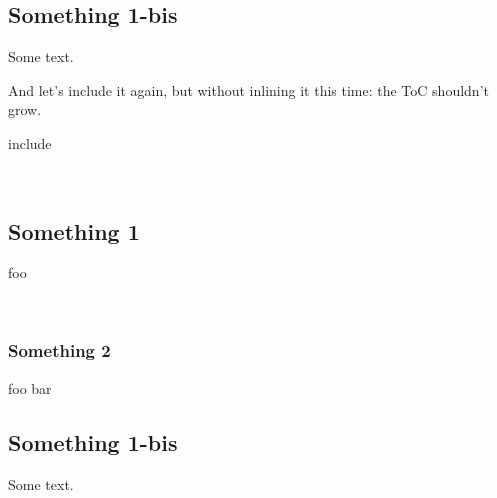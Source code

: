 \subsection{Something 1-bis\label{something-1-bis}}%
Some text.

And let's include it again, but without inlining it this time: the ToC shouldn't grow.

\begin{keyword}include\end{keyword}
 \hyperref[package-test+u+package+++ml-module-Include+u+sections-module-type-Something]{}\label{package-test+u+package+++ml-module-Include+u+sections-val-something}\\
\subsection{Something 1\label{something-1}}%
foo

\label{package-test+u+package+++ml-module-Include+u+sections-val-foo}\\
\subsubsection{Something 2\label{something-2}}%
\label{package-test+u+package+++ml-module-Include+u+sections-val-bar}\begin{ocamlindent}foo bar\end{ocamlindent}%
\medbreak
\subsection{Something 1-bis\label{something-1-bis}}%
Some text.



